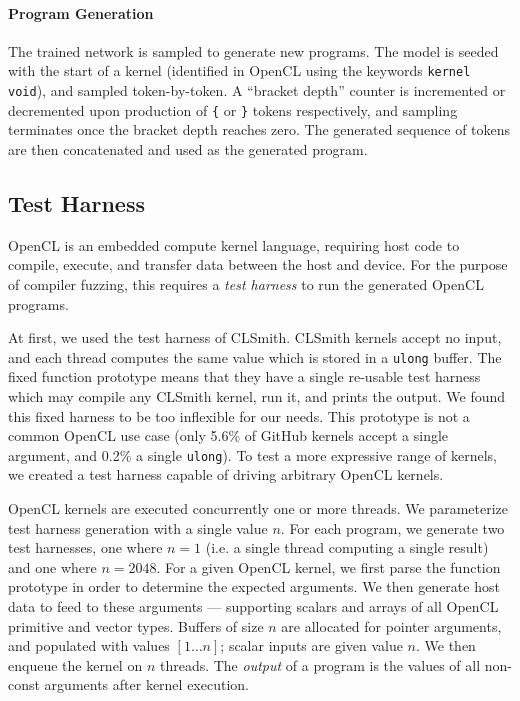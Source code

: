 \paragraph{Program Generation} The trained network is sampled to generate new programs. The model is seeded with the start of a kernel (identified in OpenCL using the keywords \texttt{kernel void}), and sampled token-by-token. A ``bracket depth'' counter is incremented or decremented upon production of \texttt{\{} or \texttt{\}} tokens respectively, and sampling terminates once the bracket depth reaches zero. The generated sequence of tokens are then concatenated and used as the generated program. 


\subsection{Test Harness}


OpenCL is an embedded compute kernel language, requiring host code to compile, execute, and transfer data between the host and device. For the purpose of compiler fuzzing, this requires a \emph{test harness} to run the generated OpenCL programs.

At first, we used the test harness of CLSmith. CLSmith kernels accept no input, and each thread computes the same value which is stored in a \texttt{ulong} buffer. The fixed function prototype means that they have a single re-usable test harness which may compile any CLSmith kernel, run it, and prints the output. We found this fixed harness to be too inflexible for our needs. This prototype is not a common OpenCL use case (only 5.6\% of GitHub kernels accept a single argument, and 0.2\% a single \texttt{ulong}).
To test a more expressive range of kernels, we created a test harness capable of driving arbitrary OpenCL kernels.

OpenCL kernels are executed concurrently one or more threads. We parameterize test harness generation with a single value $n$. For each program, we generate two test harnesses, one where $n=1$ (i.e. a single thread computing a single result) and one where $n = 2048$. For a given OpenCL kernel, we first parse the function prototype in order to determine the expected arguments. We then generate host data to feed to these arguments --- supporting scalars and arrays of all OpenCL primitive and vector types. Buffers of size $n$ are allocated for pointer arguments, and populated with values {$[1 \ldots n]$}; scalar inputs are given value $n$. We then enqueue the kernel on $n$ threads. The \emph{output} of a program is the values of all non-const arguments after kernel execution.

